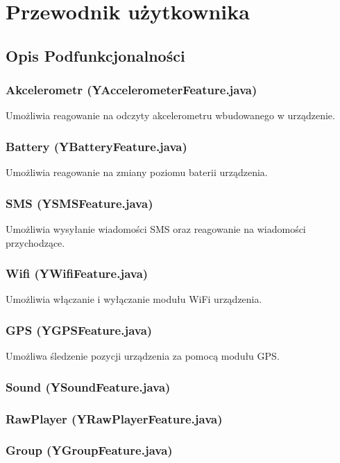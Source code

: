 \documentclass[11pt,a4paper,polish,thesis]{dcsbook}
\begin{document}
\appendix

\chapter{Przewodnik użytkownika}
\section{Opis Podfunkcjonalności}
\subsection{Akcelerometr (YAccelerometerFeature.java)}
Umożliwia reagowanie na odczyty akcelerometru wbudowanego w urządzenie. 

\subsection{Battery (YBatteryFeature.java)}
Umożliwia reagowanie na zmiany poziomu baterii urządzenia.

\subsection{SMS (YSMSFeature.java)}
Umożliwia wysyłanie wiadomości SMS oraz reagowanie na wiadomości przychodzące.

\subsection{Wifi (YWifiFeature.java)}
Umożliwia włączanie i wyłączanie modułu WiFi urządzenia.

\subsection{GPS (YGPSFeature.java)}
Umożliwa śledzenie pozycji urządzenia za pomocą modułu GPS.

\subsection{Sound (YSoundFeature.java)}

\subsection{RawPlayer (YRawPlayerFeature.java)}

\subsection{Group (YGroupFeature.java)}
\end{document}
